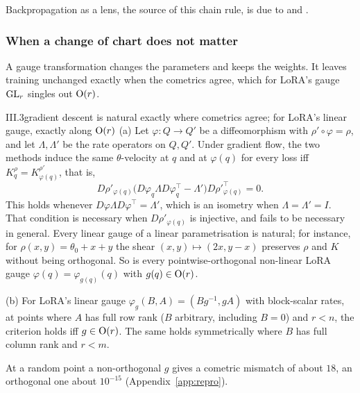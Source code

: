Backpropagation as a lens, the source of this chain rule, is due to \citet{fong2017backprop} and \citet{cruttwell2021categorical}.

\subsubsection{When a change of chart does not matter}\label{sec:fibres-naturality}

A gauge transformation changes the parameters and keeps the weights. It leaves training unchanged exactly when the cometrics agree, which for LoRA's gauge $\mathrm{GL}_r$ singles out $\mathrm{O}(r)$.

\begin{theorem}{III.3}{gradient descent is natural exactly where cometrics agree; for LoRA's linear gauge, exactly along $\mathrm{O}(r)$}
(a) Let $\varphi:Q\to Q'$ be a diffeomorphism with $\rho'\circ\varphi=\rho$, and let $\Lambda,\Lambda'$ be the rate operators on $Q,Q'$. Under gradient flow, the two methods induce the same $\theta$-velocity at $q$ and at $\varphi(q)$ for every loss iff $K^\rho_q=K^{\rho'}_{\varphi(q)}$, that is,
\[D\rho'_{\varphi(q)}\big(D\varphi_q\Lambda D\varphi_q^\top-\Lambda'\big)D\rho'^\top_{\varphi(q)}=0.\]
This holds whenever $D\varphi\Lambda D\varphi^\top=\Lambda'$, which is an isometry when $\Lambda=\Lambda'=I$. That condition is necessary when $D\rho'_{\varphi(q)}$ is injective, and fails to be necessary in general. Every linear gauge of a linear parametrisation is natural; for instance, for $\rho(x,y)=\theta_0+x+y$ the shear $(x,y)\mapsto(2x,y-x)$ preserves $\rho$ and $K$ without being orthogonal. So is every pointwise-orthogonal non-linear LoRA gauge $\varphi(q)=\varphi_{g(q)}(q)$ with $g(q)\in\mathrm{O}(r)$.

(b) For LoRA's linear gauge $\varphi_g(B,A)=(Bg^{-1},gA)$ with block-scalar rates, at points where $A$ has full row rank ($B$ arbitrary, including $B=0$) and $r<n$, the criterion holds iff $g\in\mathrm{O}(r)$. The same holds symmetrically where $B$ has full column rank and $r<m$.
\end{theorem}

\noindent{}\enspace At a random point a non-orthogonal $g$ gives a cometric mismatch of about $18$, an orthogonal one about $10^{-15}$ (Appendix~\ref{app:repro}).

